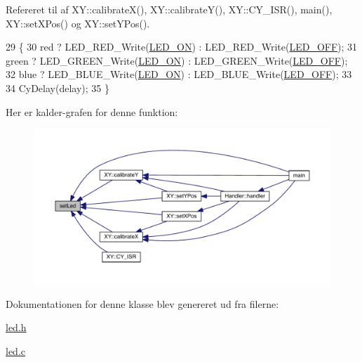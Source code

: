Refereret til af X\+Y\+::calibrate\+X(), X\+Y\+::calibrate\+Y(), X\+Y\+::\+C\+Y\+\_\+\+I\+S\+R(), main(), X\+Y\+::set\+X\+Pos() og X\+Y\+::set\+Y\+Pos().


\begin{DoxyCode}
29 \{
30   red ? LED\_RED\_Write(\hyperlink{led_8h_af2e697ac60e05813d45ea2c9c9e79c25}{LED\_ON}) : LED\_RED\_Write(\hyperlink{led_8h_a80700bb63bd56ebabbb4728aa433fd29}{LED\_OFF});
31   green ? LED\_GREEN\_Write(\hyperlink{led_8h_af2e697ac60e05813d45ea2c9c9e79c25}{LED\_ON}) : LED\_GREEN\_Write(\hyperlink{led_8h_a80700bb63bd56ebabbb4728aa433fd29}{LED\_OFF});
32   blue ? LED\_BLUE\_Write(\hyperlink{led_8h_af2e697ac60e05813d45ea2c9c9e79c25}{LED\_ON}) : LED\_BLUE\_Write(\hyperlink{led_8h_a80700bb63bd56ebabbb4728aa433fd29}{LED\_OFF});
33   
34   CyDelay(delay);
35 \}
\end{DoxyCode}


Her er kalder-\/grafen for denne funktion\+:
\nopagebreak
\begin{figure}[H]
\begin{center}
\leavevmode
\includegraphics[width=350pt]{d3/dbe/class_l_e_d_a1d8e725e3829da99c1d027ba0a2ce57a_icgraph}
\end{center}
\end{figure}




Dokumentationen for denne klasse blev genereret ud fra filerne\+:\begin{DoxyCompactItemize}
\item 
\hyperlink{led_8h}{led.\+h}\item 
\hyperlink{led_8c}{led.\+c}\end{DoxyCompactItemize}
